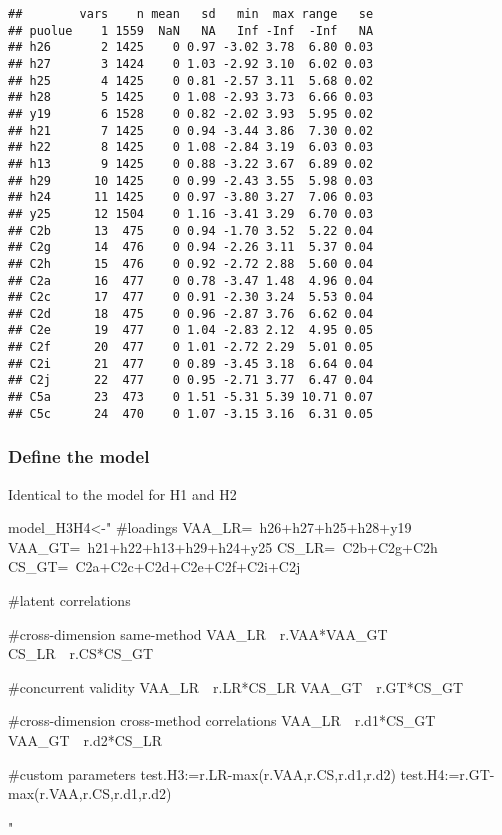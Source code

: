 \documentclass[
]{article}
\newenvironment{Shaded}{\begin{snugshade}}{\end{snugshade}}
\newcommand{\NormalTok}[1]{#1}
\newcommand{\StringTok}[1]{\textcolor[rgb]{0.31,0.60,0.02}{#1}}
\begin{document}
\begin{verbatim}
##        vars    n mean   sd   min  max range   se
## puolue    1 1559  NaN   NA   Inf -Inf  -Inf   NA
## h26       2 1425    0 0.97 -3.02 3.78  6.80 0.03
## h27       3 1424    0 1.03 -2.92 3.10  6.02 0.03
## h25       4 1425    0 0.81 -2.57 3.11  5.68 0.02
## h28       5 1425    0 1.08 -2.93 3.73  6.66 0.03
## y19       6 1528    0 0.82 -2.02 3.93  5.95 0.02
## h21       7 1425    0 0.94 -3.44 3.86  7.30 0.02
## h22       8 1425    0 1.08 -2.84 3.19  6.03 0.03
## h13       9 1425    0 0.88 -3.22 3.67  6.89 0.02
## h29      10 1425    0 0.99 -2.43 3.55  5.98 0.03
## h24      11 1425    0 0.97 -3.80 3.27  7.06 0.03
## y25      12 1504    0 1.16 -3.41 3.29  6.70 0.03
## C2b      13  475    0 0.94 -1.70 3.52  5.22 0.04
## C2g      14  476    0 0.94 -2.26 3.11  5.37 0.04
## C2h      15  476    0 0.92 -2.72 2.88  5.60 0.04
## C2a      16  477    0 0.78 -3.47 1.48  4.96 0.04
## C2c      17  477    0 0.91 -2.30 3.24  5.53 0.04
## C2d      18  475    0 0.96 -2.87 3.76  6.62 0.04
## C2e      19  477    0 1.04 -2.83 2.12  4.95 0.05
## C2f      20  477    0 1.01 -2.72 2.29  5.01 0.05
## C2i      21  477    0 0.89 -3.45 3.18  6.64 0.04
## C2j      22  477    0 0.95 -2.71 3.77  6.47 0.04
## C5a      23  473    0 1.51 -5.31 5.39 10.71 0.07
## C5c      24  470    0 1.07 -3.15 3.16  6.31 0.05
\end{verbatim}

\newpage

\hypertarget{define-the-model}{%
\subsubsection{Define the model}\label{define-the-model}}

Identical to the model for H1 and H2

\begin{Shaded}
\begin{Highlighting}[]
\NormalTok{model_H3H4<-}\StringTok{"}
\StringTok{#loadings}
\StringTok{VAA_LR=~h26+h27+h25+h28+y19}
\StringTok{VAA_GT=~h21+h22+h13+h29+h24+y25}
\StringTok{CS_LR=~C2b+C2g+C2h}
\StringTok{CS_GT=~C2a+C2c+C2d+C2e+C2f+C2i+C2j}

\StringTok{#latent correlations}

\StringTok{#cross-dimension same-method}
\StringTok{VAA_LR~~r.VAA*VAA_GT}
\StringTok{CS_LR~~r.CS*CS_GT}

\StringTok{#concurrent validity}
\StringTok{VAA_LR~~r.LR*CS_LR}
\StringTok{VAA_GT~~r.GT*CS_GT}

\StringTok{#cross-dimension cross-method correlations}
\StringTok{VAA_LR~~r.d1*CS_GT}
\StringTok{VAA_GT~~r.d2*CS_LR}

\StringTok{#custom parameters}
\StringTok{test.H3:=r.LR-max(r.VAA,r.CS,r.d1,r.d2)}
\StringTok{test.H4:=r.GT-max(r.VAA,r.CS,r.d1,r.d2)}

\StringTok{"}
\end{Highlighting}
\end{Shaded}
\end{document}
